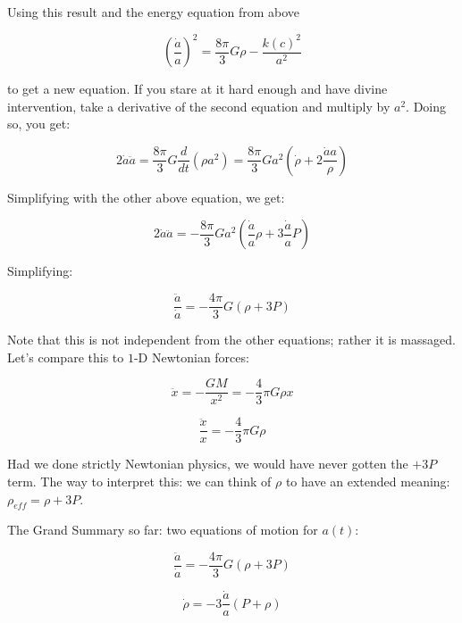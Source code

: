 \documentclass{article}
\begin{document}
Using this result and the energy equation from above

\begin{equation}
    \left(\frac{\dot{a}}{a}\right)^2 = \frac{8\pi}{3}G \rho - \frac{k (c)^2}{a^2}
\end{equation}

to get a new equation. If you stare at it hard enough and have divine intervention, take a derivative of the second equation and multiply by $a^2$. Doing so, you get:

\begin{equation}
    2 \dot{a} \ddot{a} = \frac{8\pi}{3}G\frac{d}{dt}(\rho a^2) = \frac{8\pi}{3}Ga^2\left(\dot{\rho} + 2\frac{\dot{a}{a}}\rho\right)
\end{equation}

Simplifying with the other above equation, we get:

\begin{equation}
    2\dot{a}\ddot{a} = -\frac{8\pi}{3}Ga^2 \left(\frac{\dot{a}}{a}\rho + 3\frac{\dot{a}}{a}P\right)
\end{equation}

Simplifying:

\begin{equation}
    \frac{\ddot{a}}{\dot{a}} = -\frac{4\pi}{3}G \left(\rho + 3P\right)
\end{equation}

Note that this is not independent from the other equations; rather it is massaged. Let's compare this to $1$-D Newtonian forces:

\begin{equation}
    \ddot{x} = -\frac{GM}{x^2} = -\frac{4}{3}\pi G \rho x
\end{equation}

\begin{equation}
    \frac{\ddot{x}}{x} = -\frac{4}{3}\pi G \rho 
\end{equation}

Had we done strictly Newtonian physics, we would have never gotten the $+3P$ term. The way to interpret this: we can think of $\rho$ to have an extended meaning: $\rho_{eff} = \rho + 3P$. 

The Grand Summary so far: two equations of motion for $a(t)$: 

\begin{equation}
    \frac{\ddot{a}}{\dot{a}} = -\frac{4\pi}{3}G \left(\rho + 3P\right)
\end{equation}

\begin{equation}
    \dot{\rho}= -3\frac{\dot{a}}{a}\left(P + \rho\right)
\end{equation}
\end{document}
